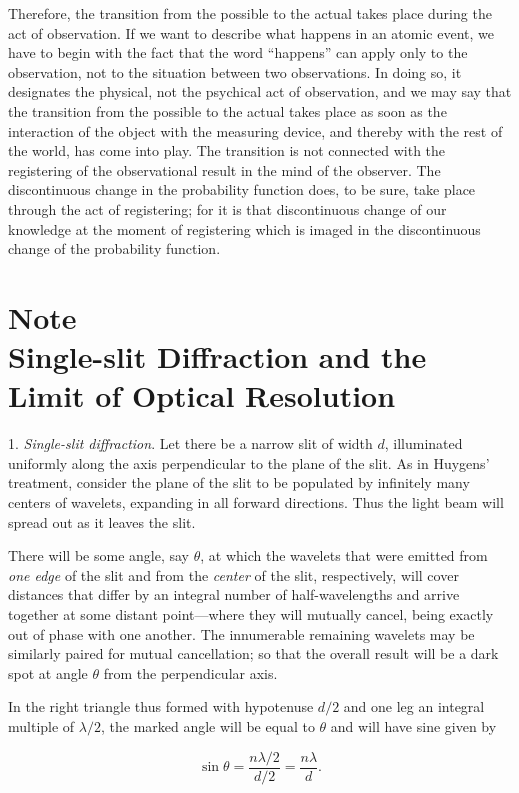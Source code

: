 Therefore, the transition from the possible to the actual takes place
during the act of observation. If we want to describe what happens in an
atomic event, we have to begin with the fact that the word ``happens''
can apply only to the observation, not to the situation between two
observations. In doing so, it designates the physical, not the psychical
act of observation, and we may say that the transition from the possible
to the actual takes place as soon as the interaction of the object with
the measuring device, and thereby with the rest of the world, has come
into play. The transition is not connected with the registering of the
observational result in the mind of the observer. The discontinuous
change in the probability function does, to be sure, take place through
the act of registering; for it is that discontinuous change of our
knowledge at the moment of registering which is imaged in the
discontinuous change of the probability function.

\section*{Note\\
  {\large Single-slit Diffraction and the Limit of Optical Resolution}}

1. \emph{Single-slit diffraction}. Let there be a narrow slit of width
$d$, illuminated uniformly along the axis perpendicular to the
plane of the slit. As in Huygens' treatment, consider the plane of the
slit to be populated by infinitely many centers of wavelets, expanding
in all forward directions. Thus the light beam will spread out as it
leaves the slit.

There will be some angle, say $\theta$, at which the wavelets that were
emitted from \emph{one edge} of the slit and from the \emph{center} of
the slit, respectively, will cover distances that differ by an integral
number of half-wavelengths and arrive together at some distant
point---where they will mutually cancel, being exactly out of phase with
one another. The innumerable remaining wavelets may be similarly paired
for mutual cancellation; so that the overall result will be a dark spot
at angle $\theta$ from the perpendicular axis.

In the right triangle thus formed with hypotenuse $d/2$ and one leg
an integral multiple of $\lambda/2$, the marked angle will be equal to
$\theta$ and will have sine given by

\begin{equation*}
\sin \theta = \frac{n\lambda/2}{d/2} = \frac{n\lambda}{d}.
\end{equation*}

